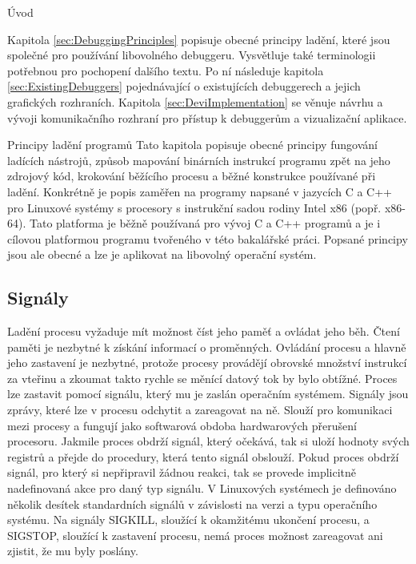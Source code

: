 \documentclass[czech,bachelor,male,python,dept460]{diploma}						%
\newcommand{\parspace}[1][]{
	\ifthenelse{\isempty{#1}}{\vspace{5mm}}{\vspace{#1}}
	\par
}
\begin{document}
\begin{section}{Úvod}
	\parspace Kapitola \ref{sec:DebuggingPrinciples} popisuje obecné principy ladění, které jsou společné pro používání libovolného debuggeru.
	Vysvětluje také terminologii potřebnou pro pochopení dalšího textu. Po ní následuje kapitola \ref{sec:ExistingDebuggers} pojednávající o existujících
	debuggerech a jejich grafických rozhraních. Kapitola \ref{sec:DeviImplementation} se věnuje návrhu a vývoji komunikačního rozhraní pro přístup k debuggerům
	a vizualizační aplikace.
\end{section}
\begin{section}{Principy ladění programů}
\label{sec:DebuggingPrinciples}
	Tato kapitola popisuje obecné principy fungování ladících nástrojů, způsob mapování binárních instrukcí programu zpět na jeho zdrojový kód,
	krokování běžícího procesu a běžné konstrukce používané při ladění. Konkrétně je popis zaměřen na programy napsané v jazycích C a C++
	pro Linuxové systémy s procesory s instrukční sadou rodiny Intel x86 (popř. x86-64).
	Tato platforma je běžně používaná pro vývoj C a C++ programů a je i cílovou platformou programu tvořeného v této bakalářské práci.
	Popsané principy jsou ale obecné a lze je aplikovat na libovolný operační systém.
		
	\subsection{Signály}
		Ladění procesu vyžaduje mít možnost číst jeho paměť a ovládat jeho běh. Čtení paměti je nezbytné k získání informací o proměnných.
		Ovládání procesu a hlavně jeho zastavení je nezbytné, protože procesy provádějí obrovské množství instrukcí za vteřinu a
		zkoumat takto rychle se měnící datový tok by bylo obtížné. Proces lze zastavit pomocí signálu, který mu je zaslán operačním systémem.
		Signály jsou zprávy, které lze v procesu odchytit a zareagovat na ně. \cite[21]{tanenbaum}
		Slouží pro komunikaci mezi procesy a fungují jako softwarová obdoba hardwarových přerušení procesoru.
		Jakmile proces obdrží signál, který očekává, tak si uloží hodnoty svých registrů a přejde do procedury, která tento signál obslouží.
		Pokud proces obdrží signál, pro který si nepřipravil žádnou reakci, tak se provede implicitně nadefinovaná akce pro daný typ signálu.
		V Linuxových systémech je definováno několik desítek standardních signálů v závislosti na verzi a typu operačního systému.
		Na signály SIGKILL, sloužící k okamžitému ukončení procesu, a SIGSTOP, sloužící k zastavení procesu, nemá proces možnost zareagovat ani
		zjistit, že mu byly poslány.
	

\end{section}
\end{document}
